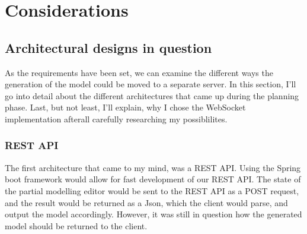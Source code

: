 \chapter{Considerations}\label{considerations}

\section{Architectural designs in question}
As the requirements have been set, we can examine the different ways the generation of the model could be
moved to a separate server. In this section, I'll go into detail about the different architectures that came up during
the planning phase. Last, but not least, I'll explain, why I chose the WebSocket implementation afterall carefully researching
my possiblilites.

\subsection{REST API}\label{restconsiderations}
The first architecture that came to my mind, was a REST API. Using the Spring boot framework would allow for fast development
of our REST API. The state of the partial modelling editor would be sent to the REST API as a POST request, and the result
would be returned as a Json, which the client would parse, and output the model accordingly. However, it was still in question
how the generated model should be returned to the client.
